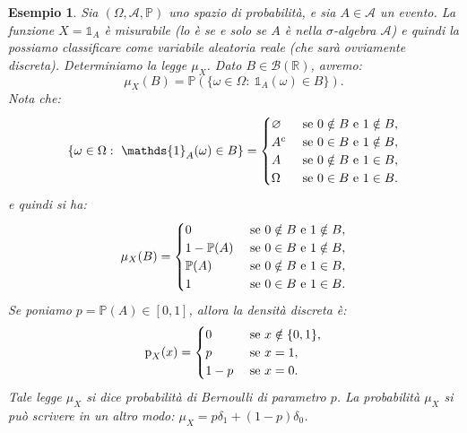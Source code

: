 \documentclass[11pt]{book}
\theoremstyle{Definizione}
\theoremstyle{TeoremaProposizioneLemmaCorollario}
\theoremstyle{OsservazioneNota}
\newtheorem{myes}{Esempio}[section]
\newcommand{\R}{\mathbb{R}}
\renewcommand{\P}{\mathbb{P}}
\newcommand{\p}{\textup{p}}
\newcommand{\uno}[1]{\mathds{1}_{#1}}
\begin{document}
\begin{myes}
Sia $(\Omega,\mathcal{A},\P)$ uno spazio di probabilità, e sia $A\in \mathcal{A}$ un evento. La funzione $X = \uno{A}$ è misurabile (lo è se e solo se $A$ è nella $\sigma$-algebra $\mathcal{A}$) e quindi la possiamo classificare come variabile aleatoria reale (che sarà ovviamente discreta). Determiniamo la legge $\mu_X$. Dato $B\in \mathcal{B}(\R)$, avremo:
$$
\mu_X(B) = \P(\{\omega\in \Omega:\ \uno{A}(\omega) \in B\}).
$$
Nota che:
$$
\{\omega\in \Omega:\ \uno{A}(\omega)\in B\} = \begin{cases}
\varnothing & \textup{ se }0\notin B\textup{ e }1\notin B,\\
A^c &\textup{ se } 0\in B \textup{ e }1\notin B,\\
A &\textup{ se }0\notin B \textup{ e }1\in B,\\
\Omega &\textup{ se }0\in B\textup{ e }1\in B.
\end{cases}
$$
e quindi si ha:
$$
\mu_X(B) = \begin{cases}
0 & \textup{ se }0\notin B\textup{ e }1\notin B,\\
1-\P(A) &\textup{ se } 0\in B \textup{ e }1\notin B,\\
\P(A) &\textup{ se }0\notin B \textup{ e }1\in B,\\
1 &\textup{ se }0\in B\textup{ e }1\in B.
\end{cases}
$$
Se poniamo $p = \P(A)\in [0,1]$, allora la densità discreta è:
$$
\p_X(x) = \begin{cases}
0 &\textup{ se }x\notin \{0,1\},\\
p &\textup{ se }x = 1,\\
1-p&\textup{ se }x = 0.
\end{cases}
$$
Tale legge $\mu_X$ si dice \textsl{probabilità di Bernoulli di parametro} $p$. La probabilità $\mu_X$ si può scrivere in un altro modo: $\mu_X = p \delta_1 + (1-p)\delta_0$.
\end{myes}
\end{document}
